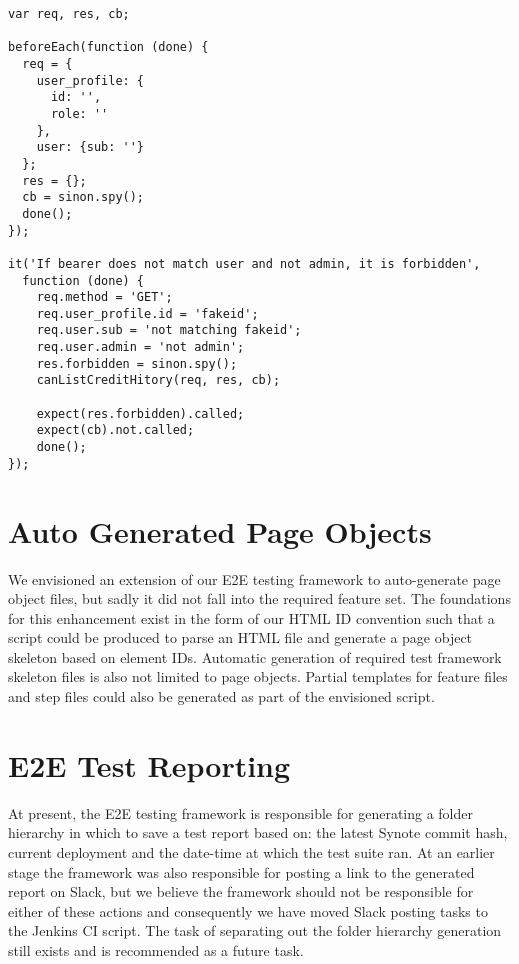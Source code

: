 \begin{listing}[H]
\begin{verbatim}
var req, res, cb;

beforeEach(function (done) {
  req = {
    user_profile: {
      id: '',
      role: ''
    },
    user: {sub: ''}
  };
  res = {};
  cb = sinon.spy();
  done();
});

it('If bearer does not match user and not admin, it is forbidden',
  function (done) {
    req.method = 'GET';
    req.user_profile.id = 'fakeid';
    req.user.sub = 'not matching fakeid';
    req.user.admin = 'not admin';
    res.forbidden = sinon.spy();
    canListCreditHitory(req, res, cb);

    expect(res.forbidden).called;
    expect(cb).not.called;
    done();
});
\end{verbatim}
\label{lst:can-list-credit-test}
\end{listing}

\section{Auto Generated Page Objects}
\label{subsec:auto-generated-page-objects}

We envisioned an extension of our E2E testing framework to auto-generate page object files, but sadly it did not fall into the required feature set. The foundations for this enhancement exist in the form of our HTML ID convention such that a script could be produced to parse an HTML file and generate a page object skeleton based on element IDs. Automatic generation of required test framework skeleton files is also not limited to page objects. Partial templates for feature files and step files could also be generated as part of the envisioned script.

\section{E2E Test Reporting}
\label{subsec:e2e-test-reporting}

At present, the E2E testing framework is responsible for generating a folder hierarchy  in which to save a test report based on: the latest Synote commit hash, current deployment and the date-time at which the test suite ran. At an earlier stage the framework was also responsible for posting a link to the generated report on Slack, but we believe the framework should not be responsible for either of these actions and consequently we have moved Slack posting tasks to the Jenkins CI script. The task of separating out the folder hierarchy generation still exists and is recommended as a future task.

